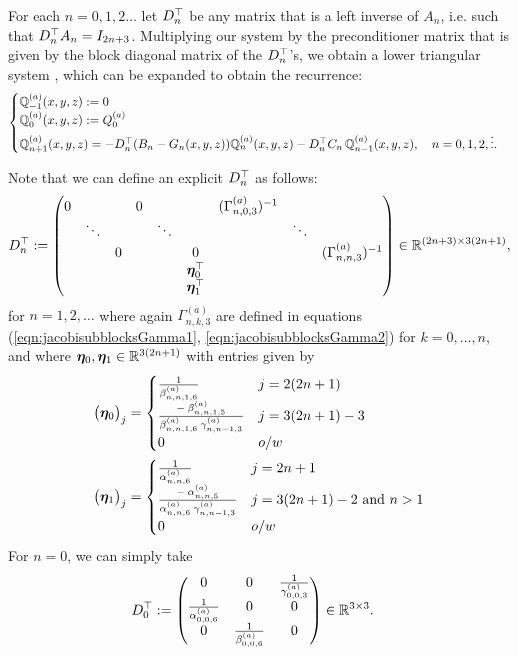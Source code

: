 \documentclass[11pt, oneside]{article}   	%
\begin{document}
For each $n = 0,1,2\dots$ let $D^\top_n$ be any matrix that is a left inverse of $A_n$, i.e. such that $D^\top_n A_n = I_{2n+3}$. Multiplying our system by the preconditioner matrix that is given by the block diagonal matrix of the $D^\top_n$'s, we obtain a lower triangular system \cite[p78]{dunkl2014orthogonal}, which can be expanded to obtain the recurrence:
\begin{align*}
	\begin{cases}
		\mathbb{{Q}}^{(a)}_{-1}(x,y,z) := 0 \\
		\mathbb{{Q}}^{(a)}_{0}(x,y,z) := Q^{(a)}_0 \\
		\mathbb{{Q}}^{(a)}_{n+1}(x,y,z) = -D^\top_n (B_n-G_n(x,y,z)) \mathbb{{Q}}^{(a)}_n(x,y,z) - D^\top_n C_n  \, \mathbb{{Q}}^{(a)}_{n-1}(x,y,z), \quad n = 0,1,2,\vdots.
	\end{cases}
\end{align*}

Note that we can define an explicit $D^\top_n$ as follows:
\begin{align*}
	D^\top_n := 
		\begin{pmatrix}
			0 & & & 0 & & & (\Gamma^{(a)}_{n,0,3})^{-1} & & \\
			& \ddots & & & \ddots & & & \ddots \\
			& & 0 & & & 0 & & & (\Gamma^{(a)}_{n,n,3})^{-1}  \\
			& & & & & \bm{\eta}^\top_{0} & & & \\
			& & & & & \bm{\eta}^\top_{1} & & &
		\end{pmatrix} \in \mathbb{R}^{(2n+3)\times3(2n+1)},
\end{align*}
for $n = 1, 2, \dots$ where again $\Gamma^{(a)}_{n,k,3}$ are defined in equations (\ref{eqn:jacobisubblocksGamma1}, \ref{eqn:jacobisubblocksGamma2}) for $k=0,\dots,n$, and where $\bm{\eta}_{0}, \bm{\eta}_{1} \in \mathbb{R}^{3(2n+1)}$ with entries given by 
\begin{align*}
	\big(\bm{\eta}_{0}\big)_j &= 
		\begin{cases}
			\frac{1}{\beta^{(a)}_{n,n,1,6}} & j = 2(2n+1) \\
			\frac{- \: \beta^{(a)}_{n,n,1,5}}{\beta^{(a)}_{n,n,1,6} \: \gamma^{(a)}_{n, n-1, 3}} & j = 3(2n+1) - 3 \\
			0 & o/w
		\end{cases} \\
	\big(\bm{\eta}_{1}\big)_j &= 
		\begin{cases}
			\frac{1}{\alpha^{(a)}_{n,n,6}} & j = 2n+1 \\
			\frac{- \: \alpha^{(a)}_{n,n,5}}{\alpha^{(a)}_{n,n,6} \: \gamma^{(a)}_{n, n-1, 3}} & j = 3(2n+1) - 2  \text{ and } n > 1 \\
			0 & o/w
		\end{cases}
\end{align*}
For $n=0$, we can simply take
\begin{align*}
	D^\top_0 &:= 
		\begin{pmatrix}
			0 & 0 & \frac{1}{\gamma^{(a)}_{0,0,3}} \\
			\frac{1}{\alpha^{(a)}_{0,0,6}} & 0 & 0 \\
			0 & \frac{1}{\beta^{(a)}_{0,0,6}} & 0
		\end{pmatrix} \in \mathbb{R}^{3\times3}.
\end{align*}
\end{document}
